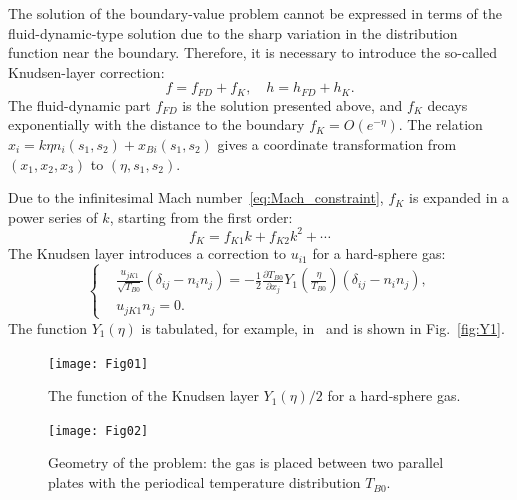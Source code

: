 \documentclass[smallextended, referee]{svjour3} %
\newcommand{\pder}[2][]{\frac{\partial#1}{\partial#2}}
\begin{document}
The solution of the boundary-value problem cannot be expressed in terms of the fluid-dynamic-type
solution due to the sharp variation in the distribution function near the boundary.
Therefore, it is necessary to introduce the so-called Knudsen-layer correction:
\begin{equation}
    f = f_{FD} + f_K, \quad h = h_{FD} + h_K.
\end{equation}
The fluid-dynamic part \(f_{FD}\) is the solution presented above,
and \(f_K\) decays exponentially with the distance to the boundary \(f_K = O\left(e^{-\eta}\right)\).
The relation \( x_i = k\eta n_i(s_1,s_2) + x_{Bi}(s_1, s_2) \) gives a coordinate transformation
from \((x_1,x_2,x_3)\) to \((\eta,s_1,s_2)\).

Due to the infinitesimal Mach number~\eqref{eq:Mach_constraint}, \(f_K\) is expanded
in a power series of \(k\), starting from the first order:
\[ f_K = f_{K1} k + f_{K2} k ^ 2 + \cdots \]
The Knudsen layer introduces a correction to \(u_{i1}\) for a hard-sphere gas:
\begin{equation}
    \left\{
    \begin{aligned}
        & \frac{u_{jK1}}{\sqrt{T_{B0}}}(\delta_{ij}-n_in_j) =
            -\frac12\pder[T_{B0}]{x_j} Y_1\left(\frac\eta{T_{B0}}\right) (\delta_{ij}-n_in_j), \\
        & u_{jK1}n_j = 0.
    \end{aligned}
    \right. \label{eq:bound:v_K}
\end{equation}
The function \(Y_1(\eta)\) is tabulated, for example, in~\cite{Sone2002, Sone2007} and is shown in Fig.~\ref{fig:Y1}.

\begin{figure}[ht]
    \centering
    \begin{minipage}{.48\textwidth}
        \centering
        \texttt{[image: Fig01]}
        \caption{The function of the Knudsen layer \(Y_1(\eta)/2\) for a hard-sphere gas.}
        \label{fig:Y1}
    \end{minipage}
    \quad
    \begin{minipage}{.48\textwidth}
        \centering
        \texttt{[image: Fig02]}
        \vspace{13pt}
        \caption{Geometry of the problem: the gas is placed between two parallel plates
            with the periodical temperature distribution \(T_{B0}\).}
        \label{fig:geometry}
    \end{minipage}
\end{figure}
\end{document}
